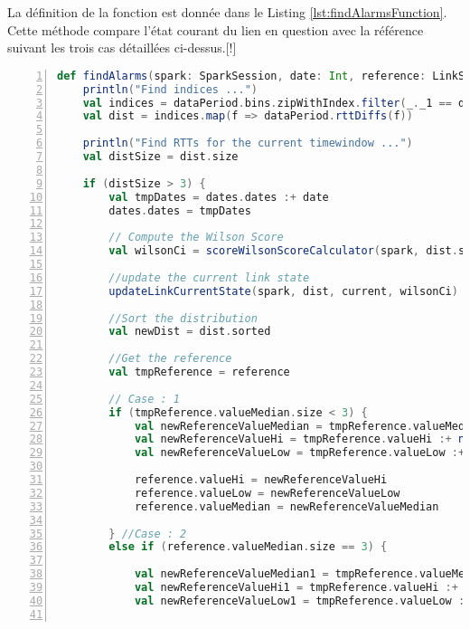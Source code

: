 La définition de la fonction  est donnée dans le Listing \ref{lst:findAlarmsFunction}. Cette méthode compare l'état courant du lien en question avec la référence suivant les trois cas détaillées ci-dessus.[!]
\begin{lstlisting}[language=scala,firstnumber=1, caption={Définition de la classe ResumedLink},label={lst:findAlarmsFunction}, basicstyle = \footnotesize,escapechar=|,numbers=left,
stepnumber=1]
  def findAlarms(spark: SparkSession, date: Int, reference: LinkState, dataPeriod: ResumedLink, current: LinkState, alarmsDates: AlarmsDates, alarmsValues: AlarmsValues, dates: AllDates): Unit = {
	println("Find indices ...")
	val indices = dataPeriod.bins.zipWithIndex.filter(_._1 == date).map(_._2)
	val dist = indices.map(f => dataPeriod.rttDiffs(f))
	
	println("Find RTTs for the current timewindow ...")
	val distSize = dist.size
	
	if (distSize > 3) {
		val tmpDates = dates.dates :+ date
		dates.dates = tmpDates
		
		// Compute the Wilson Score
		val wilsonCi = scoreWilsonScoreCalculator(spark, dist.size).map(f => f * dist.size)
		
		//update the current link state
		updateLinkCurrentState(spark, dist, current, wilsonCi)
		
		//Sort the distribution
		val newDist = dist.sorted
		
		//Get the reference
		val tmpReference = reference
		
		// Case : 1
		if (tmpReference.valueMedian.size < 3) {
			val newReferenceValueMedian = tmpReference.valueMedian :+ current.valueMedian.last
			val newReferenceValueHi = tmpReference.valueHi :+ newDist(javatools.JavaTools.getIntegerPart(wilsonCi(1)))
			val newReferenceValueLow = tmpReference.valueLow :+ newDist(javatools.JavaTools.getIntegerPart(wilsonCi(0)))
			
			reference.valueHi = newReferenceValueHi
			reference.valueLow = newReferenceValueLow
			reference.valueMedian = newReferenceValueMedian
			
		} //Case : 2
		else if (reference.valueMedian.size == 3) {
			
			val newReferenceValueMedian1 = tmpReference.valueMedian :+ medianCalculator(tmpReference.valueMedian)
			val newReferenceValueHi1 = tmpReference.valueHi :+ medianCalculator(tmpReference.valueHi)
			val newReferenceValueLow1 = tmpReference.valueLow :+ medianCalculator(tmpReference.valueLow)
			

\end{lstlisting}
